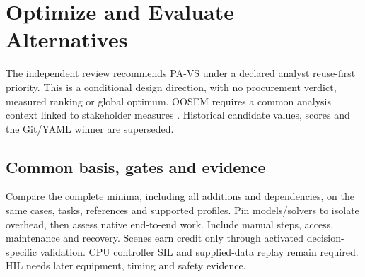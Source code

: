 \section{Optimize and Evaluate Alternatives}
\label{section:optimize-and-evaluate-alternatives}
\label{sec:framework-trade-review}

The independent review recommends PA-VS under a declared analyst reuse-first priority. This is a conditional design direction, with no procurement verdict, measured ranking or global optimum. OOSEM requires a common analysis context linked to stakeholder measures \citep[Secs.~8.11 and~17.3.6]{friedenthal2014practical}. Historical candidate values, scores and the Git/YAML winner are superseded.

\subsection{Common basis, gates and evidence}

Compare the complete minima, including all additions and dependencies, on the same cases, tasks, references and supported profiles. Pin models/solvers to isolate overhead, then assess native end-to-end work. Include manual steps, access, maintenance and recovery. Scenes earn credit only through activated decision-specific validation. CPU controller SIL and supplied-data replay remain required. HIL needs later equipment, timing and safety evidence.

